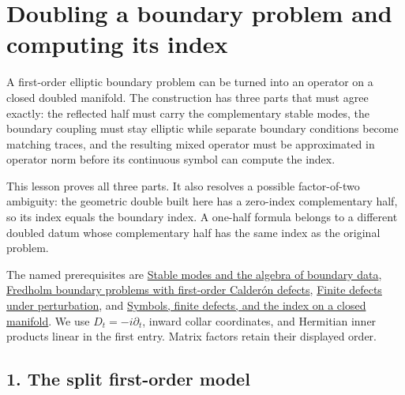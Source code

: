 \documentclass[
  11pt,
]{article}
\author{}
\date{}
\makeatletter
\let\ReaderOriginalAnchorStart\hyper@anchorstart
\let\ReaderOriginalAnchorEnd\hyper@anchorend
\let\ReaderPendingAliases\@empty
\def\ReaderArmAliases#1{\gdef\ReaderPendingAliases{#1}}
\def\hyper@anchorstart#1{\ReaderIfNativeAnchorTF{#1}{\ReaderPendingAliases\global\let\ReaderPendingAliases\@empty}{}\ReaderOriginalAnchorStart{#1}}
\makeatother
\begin{document}
\ReaderArmAliases{\ReaderOriginalAnchorStart{doubling-a-boundary-problem-and-computing-its-index}\ReaderOriginalAnchorEnd}
\section{Doubling a boundary problem and computing its
index}\label{doubling-a-boundary-problem-and-computing-its-index}

A first-order elliptic boundary problem can be turned into an operator
on a closed doubled manifold. The construction has three parts that must
agree exactly: the reflected half must carry the complementary stable
modes, the boundary coupling must stay elliptic while separate boundary
conditions become matching traces, and the resulting mixed operator must
be approximated in operator norm before its continuous symbol can
compute the index.

This lesson proves all three parts. It also resolves a possible
factor-of-two ambiguity: the geometric double built here has a
zero-index complementary half, so its index equals the boundary index. A
one-half formula belongs to a different doubled datum whose
complementary half has the same index as the original problem.

The named prerequisites are \href{stable-boundary-models.pdf}{Stable
modes and the algebra of boundary data},
\href{generalized-collar-fredholm.pdf}{Fredholm boundary problems with
first-order Calderón defects}, \href{fredholm-stability.pdf}{Finite
defects under perturbation}, and
\href{global-elliptic-symbol-index.pdf}{Symbols, finite defects, and the
index on a closed manifold}. We use \(D_t=-i\partial_t\), inward collar
coordinates, and Hermitian inner products linear in the first entry.
Matrix factors retain their displayed order.

\ReaderArmAliases{\ReaderOriginalAnchorStart{AN03-SDI-001}\ReaderOriginalAnchorEnd\begingroup\expandafter\def\csname @currentHref\endcsname{AN03-SDI-001}\label{AN03-SDI-001}\endgroup\ReaderOriginalAnchorStart{1-the-split-first-order-model}\ReaderOriginalAnchorEnd\begingroup\expandafter\def\csname @currentHref\endcsname{1-the-split-first-order-model}\label{1-the-split-first-order-model}\endgroup\ReaderOriginalAnchorStart{the-split-first-order-model}\ReaderOriginalAnchorEnd}
\subsection{1. The split first-order
model}\label{the-split-first-order-model}
\end{document}

